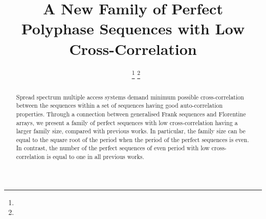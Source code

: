 \documentclass[conference,letterpaper]{IEEEtran}
\theoremstyle{definition}
\begin{document}
\title{A New Family of Perfect Polyphase Sequences with Low Cross-Correlation}



\author{   ~\IEEEmembership{}
\thanks{}
\thanks{}%


}\author{%
                      \and
{}
}



\date{}
\maketitle



\begin{abstract}

Spread spectrum multiple access systems demand minimum possible cross-correlation between the sequences within a set of sequences having good auto-correlation properties. Through a connection between generalised Frank sequences and Florentine arrays, we present a family of perfect sequences with low cross-correlation having a larger family size, compared with previous works. In particular,  the family size can be equal to the square root of the period when the period of the perfect sequences is even. In contrast, the number of the perfect sequences of even period  with low cross-correlation is equal to one in all previous works.




\end{abstract}
\end{document}
